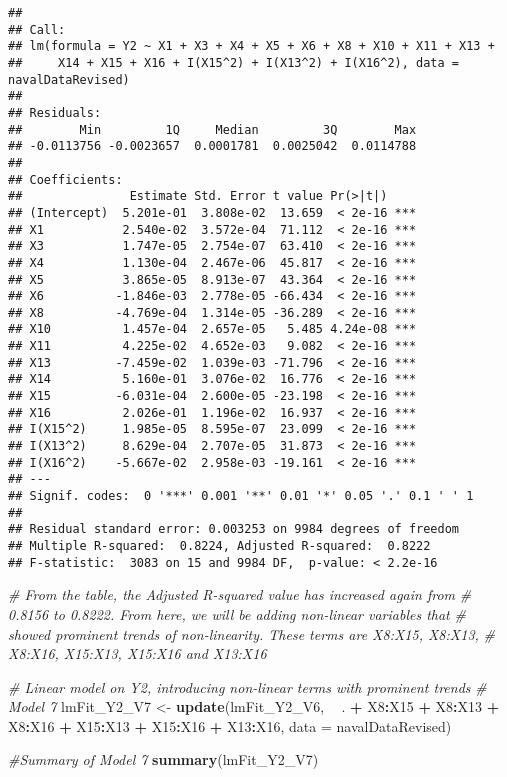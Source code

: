 \documentclass[
]{article}
\newenvironment{Shaded}{\begin{snugshade}}{\end{snugshade}}
\newcommand{\CommentTok}[1]{\textcolor[rgb]{0.56,0.35,0.01}{\textit{#1}}}
\newcommand{\DataTypeTok}[1]{\textcolor[rgb]{0.13,0.29,0.53}{#1}}
\newcommand{\KeywordTok}[1]{\textcolor[rgb]{0.13,0.29,0.53}{\textbf{#1}}}
\newcommand{\NormalTok}[1]{#1}
\newcommand{\OperatorTok}[1]{\textcolor[rgb]{0.81,0.36,0.00}{\textbf{#1}}}
\newcommand{\StringTok}[1]{\textcolor[rgb]{0.31,0.60,0.02}{#1}}
\begin{document}
\begin{verbatim}
## 
## Call:
## lm(formula = Y2 ~ X1 + X3 + X4 + X5 + X6 + X8 + X10 + X11 + X13 + 
##     X14 + X15 + X16 + I(X15^2) + I(X13^2) + I(X16^2), data = navalDataRevised)
## 
## Residuals:
##        Min         1Q     Median         3Q        Max 
## -0.0113756 -0.0023657  0.0001781  0.0025042  0.0114788 
## 
## Coefficients:
##               Estimate Std. Error t value Pr(>|t|)    
## (Intercept)  5.201e-01  3.808e-02  13.659  < 2e-16 ***
## X1           2.540e-02  3.572e-04  71.112  < 2e-16 ***
## X3           1.747e-05  2.754e-07  63.410  < 2e-16 ***
## X4           1.130e-04  2.467e-06  45.817  < 2e-16 ***
## X5           3.865e-05  8.913e-07  43.364  < 2e-16 ***
## X6          -1.846e-03  2.778e-05 -66.434  < 2e-16 ***
## X8          -4.769e-04  1.314e-05 -36.289  < 2e-16 ***
## X10          1.457e-04  2.657e-05   5.485 4.24e-08 ***
## X11          4.225e-02  4.652e-03   9.082  < 2e-16 ***
## X13         -7.459e-02  1.039e-03 -71.796  < 2e-16 ***
## X14          5.160e-01  3.076e-02  16.776  < 2e-16 ***
## X15         -6.031e-04  2.600e-05 -23.198  < 2e-16 ***
## X16          2.026e-01  1.196e-02  16.937  < 2e-16 ***
## I(X15^2)     1.985e-05  8.595e-07  23.099  < 2e-16 ***
## I(X13^2)     8.629e-04  2.707e-05  31.873  < 2e-16 ***
## I(X16^2)    -5.667e-02  2.958e-03 -19.161  < 2e-16 ***
## ---
## Signif. codes:  0 '***' 0.001 '**' 0.01 '*' 0.05 '.' 0.1 ' ' 1
## 
## Residual standard error: 0.003253 on 9984 degrees of freedom
## Multiple R-squared:  0.8224, Adjusted R-squared:  0.8222 
## F-statistic:  3083 on 15 and 9984 DF,  p-value: < 2.2e-16
\end{verbatim}

\begin{Shaded}
\begin{Highlighting}[]
\CommentTok{# From the table, the Adjusted R-squared value has increased again from}
\CommentTok{# 0.8156 to 0.8222. From here, we will be adding non-linear variables that}
\CommentTok{# showed prominent trends of non-linearity. These terms are X8:X15, X8:X13,}
\CommentTok{# X8:X16, X15:X13, X15:X16 and X13:X16}

\CommentTok{# Linear model on Y2, introducing non-linear terms with prominent trends}
\CommentTok{# Model 7}
\NormalTok{lmFit_Y2_V7 <-}\StringTok{ }\KeywordTok{update}\NormalTok{(lmFit_Y2_V6, }\OperatorTok{~}\StringTok{ }\NormalTok{. }\OperatorTok{+}\StringTok{ }\NormalTok{X8}\OperatorTok{:}\NormalTok{X15}
                                       \OperatorTok{+}\StringTok{ }\NormalTok{X8}\OperatorTok{:}\NormalTok{X13}
                                       \OperatorTok{+}\StringTok{ }\NormalTok{X8}\OperatorTok{:}\NormalTok{X16}
                                       \OperatorTok{+}\StringTok{ }\NormalTok{X15}\OperatorTok{:}\NormalTok{X13}
                                       \OperatorTok{+}\StringTok{ }\NormalTok{X15}\OperatorTok{:}\NormalTok{X16}
                                       \OperatorTok{+}\StringTok{ }\NormalTok{X13}\OperatorTok{:}\NormalTok{X16, }\DataTypeTok{data =}\NormalTok{ navalDataRevised)}

\CommentTok{#Summary of Model 7}
\KeywordTok{summary}\NormalTok{(lmFit_Y2_V7)}
\end{Highlighting}
\end{Shaded}
\end{document}
